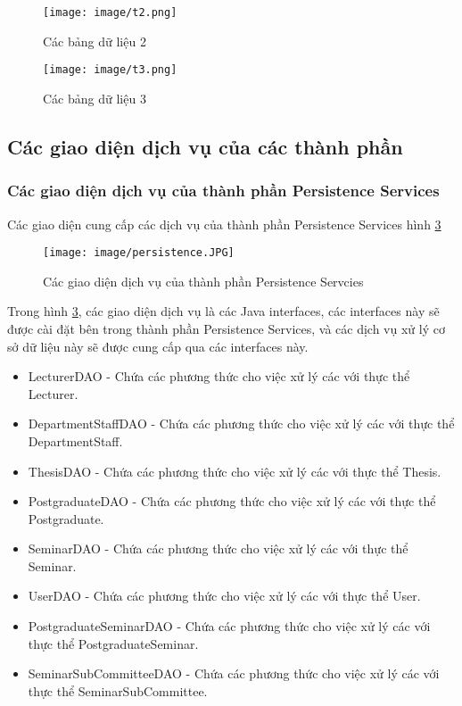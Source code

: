 \begin{figure}[htbp]
	\centering
		\texttt{[image: image/t2.png]}
	\caption{Các bảng dữ liệu 2}
	\label{fig:t2}
\end{figure}

\begin{figure}[htbp]
	\centering
		\texttt{[image: image/t3.png]}
	\caption{Các bảng dữ liệu 3}
	\label{fig:t3}
\end{figure}

\subsection{Các giao diện dịch vụ của các thành phần}
\subsubsection{Các giao diện dịch vụ của thành phần Persistence Services}
Các giao diện cung cấp các dịch vụ của thành phần Persistence Services hình \ref{fig:persistence}
\begin{figure}[htbp]
	\centering
		\texttt{[image: image/persistence.JPG]}
	\caption{Các giao diện dịch vụ của thành phần Persistence Servcies}
	\label{fig:persistence}
\end{figure}

Trong hình \ref{fig:persistence}, các giao diện dịch vụ là các Java interfaces, các interfaces này sẽ được cài đặt bên trong thành phần Persistence Services, và các dịch vụ xử lý cơ sở dữ liệu này sẽ được cung cấp qua các interfaces này.
\begin{itemize}
\item LecturerDAO - Chứa các phương thức cho việc xử lý các với thực thể Lecturer.
\item DepartmentStaffDAO - Chứa các phương thức cho việc xử lý các với thực thể DepartmentStaff.
\item ThesisDAO - Chứa các phương thức cho việc xử lý các với thực thể Thesis.
\item PostgraduateDAO - Chứa các phương thức cho việc xử lý các với thực thể Postgraduate.
\item SeminarDAO - Chứa các phương thức cho việc xử lý các với thực thể Seminar.
\item UserDAO - Chứa các phương thức cho việc xử lý các với thực thể User.
\item PostgraduateSeminarDAO - Chứa các phương thức cho việc xử lý các với thực thể PostgraduateSeminar.
\item SeminarSubCommitteeDAO - Chứa các phương thức cho việc xử lý các với thực thể SeminarSubCommittee.
\end{itemize} 


